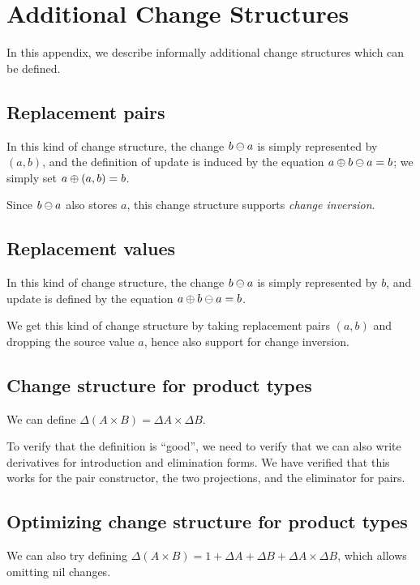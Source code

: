 \section{Additional Change Structures}
\label{sec:additional}
In this appendix, we describe informally additional change structures which can be defined.


\subsection{Replacement pairs}
In this kind of change structure, %
the change $\Diff{b}{a}$ is simply represented by $(a, b)$, and
the definition of update is induced by the equation $\Update{a}{\Diff{b}{a}} = b$; we simply set
$\Update{a}{(a, b)} = b$.

Since $\Diff{b}{a}$ also stores $a$, this change structure
supports \emph{change inversion}.

\subsection{Replacement values}
In this kind of change structure, %
the change $\Diff{b}{a}$ is simply represented by $b$, and
update is defined by the equation $\Update{a}{\Diff{b}{a}} = b$.

We get this kind of change structure by taking replacement pairs
$(a, b)$ and dropping the source value %
$a$, hence also support for change inversion.

\subsection{Change structure for product types}
We can define $\Delta(A \times B) = \Delta{A} \times \Delta{B}$.

To verify that the definition is ``good'', we need to verify that
we can also write derivatives for introduction and elimination
forms. We have verified that this works for the pair constructor,
the two projections, and the eliminator for pairs.

\subsection{Optimizing change structure for product types}
We can also try defining
$\Delta(A \times B) = 1 + \Delta{A} + \Delta{B} + \Delta{A}
\times \Delta{B}$, which allows omitting nil changes.

